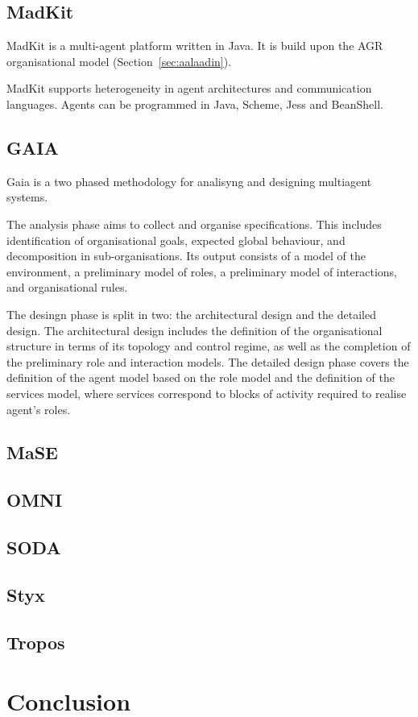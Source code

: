 \documentclass{article}
\begin{document}
\subsection{MadKit} 

MadKit is a multi-agent platform written in Java. It is build upon
the AGR organisational model (Section~\ref{sec:aalaadin}).

MadKit supports heterogeneity in agent architectures and
communication languages. Agents can be programmed in Java,
Scheme, Jess and BeanShell.

\subsection{GAIA}

Gaia is a two phased methodology for analisyng and designing multiagent
systems.

The analysis phase aims to collect and organise specifications. This includes
identification of organisational goals, expected global behaviour, and
decomposition in sub-organisations. Its output consists of a model of the
environment, a preliminary model of roles, a preliminary model of interactions,
and organisational rules.

The desingn phase is split in two: the architectural design and the detailed
design. The architectural design includes the definition of the organisational
structure in terms of its topology and control regime, as well as the
completion of the preliminary role and interaction models. The detailed design
phase covers the definition of the agent model based on the role model and the
definition of the services model, where services correspond to blocks of
activity required to realise agent's roles.

\subsection{MaSE}
\subsection{OMNI}
\subsection{SODA}
\subsection{Styx}
\subsection{Tropos}
\section{Conclusion}



\end{document}
